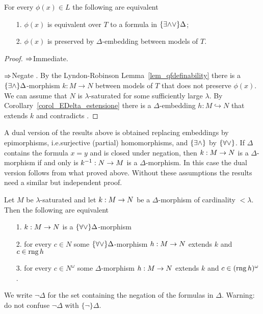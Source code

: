 \begin{theorem}\label{thm_embeddings_preservation_E}
For every $\phi(x)\in L$ the following are equivalent
\begin{itemize}
\item[1.] $\phi(x)$ is equivalent over $T$ to a formula in $\{\exists{\wedge}{\vee}\}\Delta$;
\item[2.] $\phi(x)$ is preserved by $\Delta$-embedding between models of $T$.
\end{itemize}
\end{theorem}
\begin{proof}
$\Rightarrow$\quad Immediate. 

$\Rightarrow$\quad Negate . By the Lyndon-Robinson Lemma~\ref{lem_qfdefinability} there is a $\{\exists\wedge\}\Delta$-morphism $k:M\to N$ between models of $T$ that does not preserve $\phi(x)$. We can assume that $N$ is $\lambda$-saturated for some sufficiently large $\lambda$. By Corollary~\ref{corol_EDelta_estensione} there is a $\Delta$-embedding $h:M\hookrightarrow N$ that extends $k$ and contradicts .
\end{proof}

A dual version of the results above is obtained replacing embeddings by epimorphisms, i.e.\@ surjective (partial) homomorphisms, and $\{\exists\wedge\}$ by $\{\forall\vee\}$. If $\Delta$ contains the formula $x=y$ and is closed under negation, then $k:M\rightarrow N$ is a $\Delta$-morphism if and only is $k^{-1}:N\rightarrow M$ is a $\Delta$-morphism. In this case the dual version follows from what proved above. Without these assumptions the results need a similar but independent proof. 


\begin{proposition}\label{prop_ADelta_estensione}
Let $M$ be $\lambda$-saturated and let $k:M\rightarrow N$ be a $\Delta$-morphism of cardinality $<\lambda$. Then the following are equivalent
\begin{itemize}
\item[1.] $k:M\rightarrow N$ is a $\{\forall\vee\}\Delta$-morphism
\item[2.] for every $c\in N$ some $\{\forall\vee\}\Delta$-morphism $h:M\rightarrow N$ extends $k$ and $c\in\mathop{\rm rng} h$
\item[3.] for every $c\in N^{\omega}$ some $\Delta$-morphism $h:M\rightarrow N$ extends $k$ and $c\in(\mathop{\rm rng} h)^{\omega}$.
\end{itemize}
\end{proposition}

We write \emph{$\neg\Delta$} for the set containing the negation of the formulas in $\Delta$. Warning: do not confuse $\neg\Delta$ with $\{\neg\}\Delta$.

